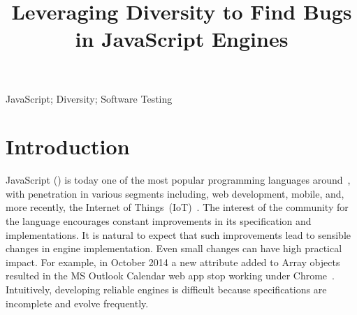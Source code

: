 \documentclass[10pt,conference,anonymous]{IEEEtran}
\begin{document}
\title{Leveraging Diversity to Find Bugs\\ in JavaScript Engines}


\maketitle

\thispagestyle{plain}
\pagestyle{plain}

\begin{abstract}
  
\end{abstract}

\begin{IEEEkeywords}
JavaScript; Diversity; Software Testing
\end{IEEEkeywords}

\section{Introduction}

JavaScript (\js{}) is today one of the most popular programming
languages around~\cite{business-insider,stackify}, with penetration in
various segments including, web development, mobile, and, more
recently, the Internet of Things~(IoT)~\cite{simply-technologies}. The
interest of the community for the language encourages constant
improvements in its specification and implementations. It is natural
to expect that such improvements lead to sensible changes in engine
implementation. Even small changes can have high practical impact. For
example, in October 2014 a new attribute added to Array objects
resulted in the MS Outlook Calendar web app stop working under
Chrome~\cite{array-bug-chromium-issue4247,array-bug-discussion}.
Intuitively, developing reliable engines is difficult because
specifications are incomplete and evolve frequently.
\end{document}
